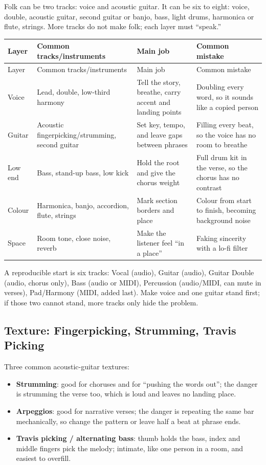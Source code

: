 Folk can be two tracks: voice and acoustic guitar. It can be six to eight: voice, double, acoustic guitar, second guitar or banjo, bass, light drums, harmonica or flute, strings. More tracks do not make folk; each layer must ``speak.''

\begin{longtable}{p{}p{}p{}p{}}
\toprule
Layer & Common tracks/instruments & Main job & Common mistake \\
\midrule
\endfirsthead
\toprule
Layer & Common tracks/instruments & Main job & Common mistake \\
\midrule
\endhead
Voice & Lead, double, low-third harmony & Tell the story, breathe, carry accent and landing points & Doubling every word, so it sounds like a copied person \\
Guitar & Acoustic fingerpicking/strumming, second guitar & Set key, tempo, and leave gaps between phrases & Filling every beat, so the voice has no room to breathe \\
Low end & Bass, stand-up bass, low kick & Hold the root and give the chorus weight & Full drum kit in the verse, so the chorus has no contrast \\
Colour & Harmonica, banjo, accordion, flute, strings & Mark section borders and place & Colour from start to finish, becoming background noise \\
Space & Room tone, close noise, reverb & Make the listener feel ``in a place'' & Faking sincerity with a lo-fi filter \\
\bottomrule
\end{longtable}

A reproducible start is six tracks: Vocal (audio), Guitar (audio), Guitar Double (audio, chorus only), Bass (audio or MIDI), Percussion (audio/MIDI, can mute in verses), Pad/Harmony (MIDI, added last). Make voice and one guitar stand first; if those two cannot stand, more tracks only hide the problem.

\subsection{Texture: Fingerpicking, Strumming, Travis Picking}
\label{sec:folk-texture}

Three common acoustic-guitar textures:

\begin{itemize}
\item \textbf{Strumming}: good for choruses and for ``pushing the words out''; the danger is strumming the verse too, which is loud and leaves no landing place.
\item \textbf{Arpeggios}: good for narrative verses; the danger is repeating the same bar mechanically, so change the pattern or leave half a beat at phrase ends.
\item \textbf{Travis picking / alternating bass}: thumb holds the bass, index and middle fingers pick the melody; intimate, like one person in a room, and easiest to overfill.
\end{itemize}

